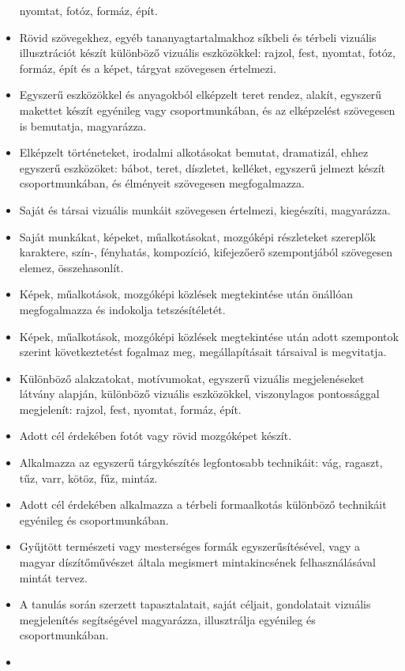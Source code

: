 \begin{itemize}
  nyomtat, fotóz, formáz, épít.
\item
  Rövid szövegekhez, egyéb tananyagtartalmakhoz síkbeli és térbeli
  vizuális illusztrációt készít különböző vizuális eszközökkel: rajzol,
  fest, nyomtat, fotóz, formáz, épít és a képet, tárgyat szövegesen
  értelmezi.
\item
  Egyszerű eszközökkel és anyagokból elképzelt teret rendez, alakít,
  egyszerű makettet készít egyénileg vagy csoportmunkában, és az
  elképzelést szövegesen is bemutatja, magyarázza.
\item
  Elképzelt történeteket, irodalmi alkotásokat bemutat, dramatizál,
  ehhez egyszerű eszközöket: bábot, teret, díszletet, kelléket, egyszerű
  jelmezt készít csoportmunkában, és élményeit szövegesen megfogalmazza.
\item
  Saját és társai vizuális munkáit szövegesen értelmezi, kiegészíti,
  magyarázza.
\item
  Saját munkákat, képeket, műalkotásokat, mozgóképi részleteket
  szereplők karaktere, szín-, fényhatás, kompozíció, kifejezőerő
  szempontjából szövegesen elemez, összehasonlít.
\item
  Képek, műalkotások, mozgóképi közlések megtekintése után önállóan
  megfogalmazza és indokolja tetszésítéletét.
\item
  Képek, műalkotások, mozgóképi közlések megtekintése után adott
  szempontok szerint következtetést fogalmaz meg, megállapításait
  társaival is megvitatja.
\item
  Különböző alakzatokat, motívumokat, egyszerű vizuális megjelenéseket
  látvány alapján, különböző vizuális eszközökkel, viszonylagos
  pontossággal megjelenít: rajzol, fest, nyomtat, formáz, épít.
\item
  Adott cél érdekében fotót vagy rövid mozgóképet készít.
\item
  Alkalmazza az egyszerű tárgykészítés legfontosabb technikáit: vág,
  ragaszt, tűz, varr, kötöz, fűz, mintáz.
\item
  Adott cél érdekében alkalmazza a térbeli formaalkotás különböző
  technikáit egyénileg és csoportmunkában.
\item
  Gyűjtött természeti vagy mesterséges formák egyszerűsítésével, vagy a
  magyar díszítőművészet általa megismert mintakincsének
  felhasználásával mintát tervez.
\item
  A tanulás során szerzett tapasztalatait, saját céljait, gondolatait
  vizuális megjelenítés segítségével magyarázza, illusztrálja egyénileg
  és csoportmunkában.
\item

\end{itemize}
